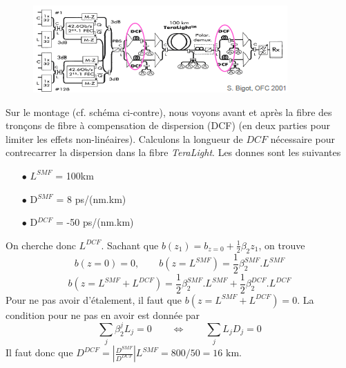 		\begin{figure}
	\vspace{-5mm}
	\includegraphics[scale=0.6]{ch1/image37}
	\end{figure}
	Sur le montage (cf. schéma ci-contre), nous voyons avant et après la fibre des tronçons de 
	fibre à compensation de dispersion (DCF) (en deux parties pour limiter les effets 
	non-linéaires). Calculons la longueur de $DCF$ nécessaire pour contrecarrer la dispersion 
	dans la fibre \textit{TeraLight}. Les donnes sont les suivantes
	\begin{itemize}
	\item[$\bullet$] $L^{SMF}$ = 100km
	\item[$\bullet$] D$^{SMF}$ = 8 ps/(nm.km)
	\item[$\bullet$] D$^{DCF}$ = -50 ps/(nm.km)		
	\end{itemize}
	On cherche donc $L^{DCF}$. Sachant que $b({z_1}) = {b_{z = 0}} + \frac{1}{2}{\beta _2}{z_1}$, 
	on trouve
	\begin{equation}
	b(z=0)=0,\qquad  b(z=L^{SMF}) = \frac{1}{2} \beta_2^{SMF}.L^{SMF}
	\end{equation}
	\begin{equation}
	b(z=L^{SMF}+L^{DCF}) = \frac{1}{2} \beta_2^{SMF}.L^{SMF}+\frac{1}{2} \beta_2^{DCF}.L^{DCF}
	\end{equation}
	Pour ne pas avoir d'étalement, il faut que $ b(z=L^{SMF}+L^{DCF})=0$. La condition pour ne pas
	en avoir est donnée par 
	\begin{equation}
	\sum_j \beta_2^j L_ j = 0\qquad\Leftrightarrow\qquad\sum_j L_jD_j=0
	\end{equation}
	Il faut donc que $D^{DCF} = \left|\frac{D^{SMF}}{D^{DCF}} \right|L^{SMF} = 800/50= 16\text{ km}$.
	

